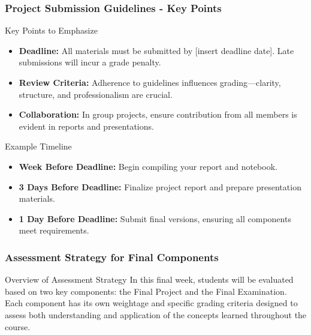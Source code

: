 \documentclass[aspectratio=169]{beamer}
\begin{document}
\begin{frame}[fragile]
    \frametitle{Project Submission Guidelines - Key Points}
    \begin{block}{Key Points to Emphasize}
        \begin{itemize}
            \item \textbf{Deadline:} All materials must be submitted by [insert deadline date]. Late submissions will incur a grade penalty.
            \item \textbf{Review Criteria:} Adherence to guidelines influences grading—clarity, structure, and professionalism are crucial.
            \item \textbf{Collaboration:} In group projects, ensure contribution from all members is evident in reports and presentations.
        \end{itemize}
    \end{block}

    \begin{block}{Example Timeline}
        \begin{itemize}
            \item \textbf{Week Before Deadline:} Begin compiling your report and notebook.
            \item \textbf{3 Days Before Deadline:} Finalize project report and prepare presentation materials.
            \item \textbf{1 Day Before Deadline:} Submit final versions, ensuring all components meet requirements.
        \end{itemize}
    \end{block}
\end{frame}

\begin{frame}[fragile]
    \frametitle{Assessment Strategy for Final Components}
    \begin{block}{Overview of Assessment Strategy}
        In this final week, students will be evaluated based on two key components:
        the Final Project and the Final Examination. Each component has its own weightage 
        and specific grading criteria designed to assess both understanding and application of the concepts learned throughout the course.
    \end{block}
\end{frame}
\end{document}
